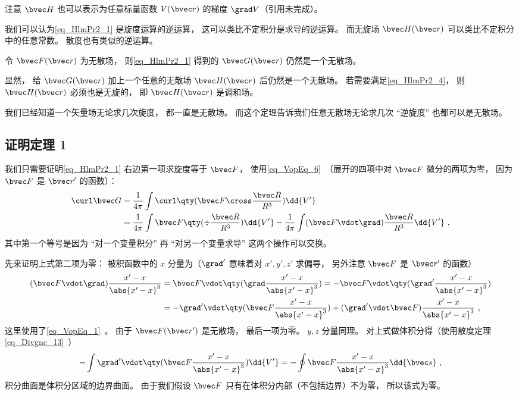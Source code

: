 注意 $\bvec H$ 也可以表示为任意标量函数 $V(\bvec r)$ 的梯度 $\grad V$（引用未完成）。

我们可以认为\autoref{eq_HlmPr2_1} 是旋度运算的逆运算， 这可以类比不定积分是求导的逆运算。 而无旋场 $\bvec H(\bvec r)$ 可以类比不定积分中的任意常数。 散度也有类似的逆运算。

\begin{theorem}{}\label{the_HlmPr2_2}
令 $\bvec F(\bvec r)$ 为无散场， 则\autoref{eq_HlmPr2_1} 得到的 $\bvec G(\bvec r)$ 仍然是一个无散场。
\end{theorem}
显然， 给 $\bvec G(\bvec r)$ 加上一个任意的无散场 $\bvec H(\bvec r)$ 后仍然是一个无散场。 若需要满足\autoref{eq_HlmPr2_4}， 则 $\bvec H(\bvec r)$ 必须也是无旋的， 即 $\bvec H(\bvec r)$ 是调和场。

我们已经知道一个矢量场无论求几次旋度， 都一直是无散场。 而这个定理告诉我们任意无散场无论求几次 “逆旋度” 也都可以是无散场。

\subsection{证明定理 1}
我们只需要证明\autoref{eq_HlmPr2_1} 右边第一项求旋度等于 $\bvec F$， 使用\autoref{eq_VopEq_6}~（展开的四项中对 $\bvec F$ 微分的两项为零， 因为 $\bvec F$ 是 $\bvec r'$ 的函数）：
\begin{equation}\label{eq_HlmPr2_3}
\begin{aligned}
\curl \bvec G &= \frac{1}{4\pi}\int \curl \qty(\bvec F \cross \frac{\bvec R}{R^3}) \dd{V'}\\
&= \frac{1}{4\pi}\int\bvec F \qty(\div \frac{\bvec R}{R^3}) \dd{V'} -  \frac{1}{4\pi}\int(\bvec F \vdot \grad) \frac{\bvec R}{R^3} \dd{V'}~,
\end{aligned}
\end{equation}
其中第一个等号是因为 “对一个变量积分” 再 “对另一个变量求导” 这两个操作可以交换。 %

先来证明上式第二项为零： 被积函数中的 $x$ 分量为（$\grad'$ 意味着对 $x', y', z'$ 求偏导， 另外注意 $\bvec F$ 是 $\bvec r'$ 的函数）
\begin{equation}\label{eq_HlmPr2_2}
\begin{aligned}
(\bvec F \vdot \grad) \frac{x' - x}{\abs{x'-x}^3} &= \bvec F \vdot \qty(\grad \frac{x' - x}{\abs{x'-x}^3}) = -\bvec F \vdot \qty(\grad' \frac{x' - x}{\abs{x'-x}^3})\\
&= - \grad' \vdot \qty(\bvec F \frac{x' - x}{\abs{x'-x}^3}) + (\grad' \vdot \bvec F) \frac{x' - x}{\abs{x'-x}^3}~,
\end{aligned}
\end{equation}
这里使用了\autoref{eq_VopEq_1}~。 由于 $\bvec F(\bvec r')$ 是无散场， 最后一项为零。 $y, z$ 分量同理。 对上式做体积分得（使用散度定理\autoref{eq_Divgnc_13}~）
\begin{equation}
- \int \grad' \vdot \qty(\bvec F \frac{x' - x}{\abs{x'-x}^3})\dd{V'} = -\oint \bvec F \frac{x' - x}{\abs{x'-x}^3} \dd{\bvec s}~,
\end{equation}
积分曲面是体积分区域的边界曲面。 由于我们假设 $\bvec F$ 只有在体积分内部（不包括边界）不为零， 所以该式为零。

